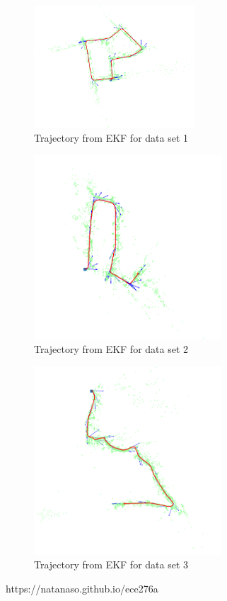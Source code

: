 \documentclass[conference]{IEEEtran}
\begin{document}
\begin{figure}[H]
\centerline{\includegraphics[width=60mm]{final27.png}}
\caption{Trajectory from EKF for data set 1}
\end{figure} 
\begin{figure}[H]
\centerline{\includegraphics[width=70mm]{final22.png}}
\caption{Trajectory from EKF for data set 2}
\end{figure} 
\begin{figure}[H]
\centerline{\includegraphics[width=70mm]{final34.png}}
\caption{Trajectory from EKF for data set 3}
\end{figure} 




\begin{thebibliography}{00}
 https://natanaso.github.io/ece276a
\end{thebibliography}
\end{document}

